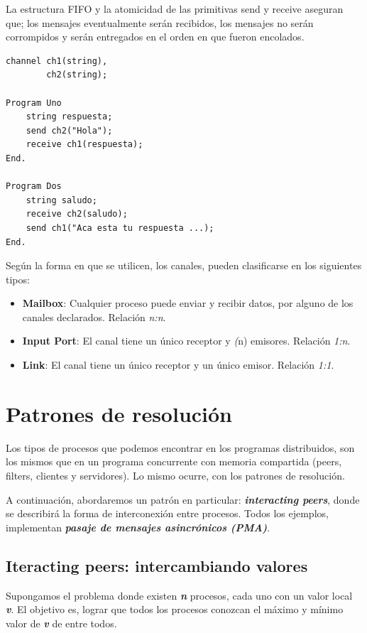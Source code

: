 \documentclass[a4paper, 10pt]{report}
\begin{document}
La estructura FIFO y la atomicidad de las primitivas send y receive aseguran que; los mensajes eventualmente serán recibidos, los mensajes no serán corrompidos y serán entregados en el orden en que fueron encolados.


\begin{lstlisting}[multicols=2]
channel ch1(string),
        ch2(string);

Program Uno
    string respuesta;
    send ch2("Hola");
    receive ch1(respuesta);
End.

Program Dos
    string saludo;
    receive ch2(saludo);
    send ch1("Aca esta tu respuesta ...);
End.
\end{lstlisting}

Según la forma en que se utilicen, los canales, pueden clasificarse en los siguientes tipos:

\begin{itemize}
    \item \textbf{Mailbox}: Cualquier proceso puede enviar y recibir datos, por alguno de los canales declarados. Relación \emph{n:n}.
    \item \textbf{Input Port}: El canal tiene un único receptor y \emph(n) emisores. Relación \emph{1:n}.
    \item \textbf{Link}: El canal tiene un único receptor y un único emisor. Relación \emph{1:1}.
\end{itemize}

\chapter{Patrones de resolución}

Los tipos de procesos que podemos encontrar en los programas distribuidos, son los mismos que en un programa concurrente con memoria compartida (peers, filters, clientes y servidores).
Lo mismo ocurre, con los patrones de resolución.

A continuación, abordaremos un patrón en particular: \textbf{\emph{interacting peers}}, donde se describirá la forma de interconexión entre procesos. Todos los ejemplos, implementan \textbf{\emph{pasaje de mensajes asincrónicos (PMA)}}.

\section{Iteracting peers: intercambiando valores}

Supongamos el problema donde existen \textbf{\emph{n}} procesos, cada uno con un valor local \textbf{\emph{v}}. El objetivo es, lograr que todos los procesos conozcan el máximo y mínimo valor de \textbf{\emph{v}} de entre todos.
\end{document}
